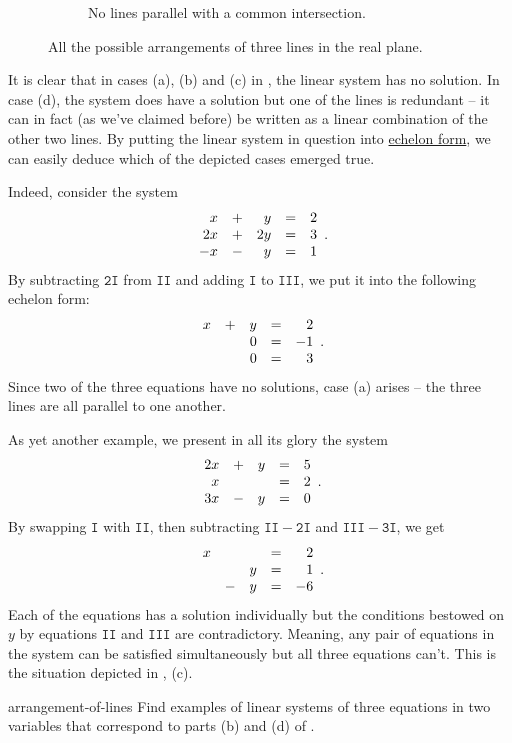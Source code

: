 \begin{figure}[ht]
\begin{subfigure}[t]{.45\textwidth}
  \caption{No lines parallel with a common intersection.}
 \end{subfigure}
 \caption{All the possible arrangements of three lines in the real plane.}
 \label{fig:arrangement-of-lines}
\end{figure}

It is clear that in cases (a), (b) and (c) in
, the linear system has no solution. In
case (d), the system does have a solution but one of the lines is redundant --
it can in fact (as we've claimed before) be written as a linear combination of
the other two lines. By putting the linear system in question into
\hyperref[def:echelon-form]{echelon form}, we can easily deduce which of the
depicted cases emerged true.

Indeed, consider the system
\[
 \begin{array}{r c r c r}
  x & + & y & = & 2\\
  2x & + & 2y & = & 3\\
  -x & - & y & = & 1
 \end{array}.
\]
By subtracting $\mathtt{2I}$ from $\mathtt{II}$ and adding $\mathtt{I}$ to
$\mathtt{III}$, we put it into the following echelon form:
\[
 \begin{array}{r c r c r}
  x & + & y & = & 2\\
    & & 0 & = & -1\\
    & & 0 & = & 3
 \end{array}.
\]
Since two of the three equations have no solutions, case (a) arises -- the three
lines are all parallel to one another.

As yet another example, we present in all its glory the system
\[
 \begin{array}{r c r c r}
  2x & + & y & = & 5\\
  x & & & = & 2\\
  3x & - & y & = & 0
 \end{array}.
\]
By swapping $\mathtt{I}$ with $\mathtt{II}$, then subtracting $\mathtt{II} -
\mathtt{2I}$ and $\mathtt{III} - \mathtt{3I}$, we get
\[
 \begin{array}{r c r c r}
  x & & & = & 2\\
  & & y & = & 1\\
  & - & y & = & -6
 \end{array}.
\]
Each of the equations has a solution individually but the conditions bestowed on
$y$ by equations $\mathtt{II}$ and $\mathtt{III}$ are contradictory. Meaning,
any pair of equations in the system can be satisfied simultaneously but all
three equations can't. This is the situation depicted in
, (c).

\begin{exercise}{}{arrangement-of-lines}
 Find examples of linear systems of three equations in two variables that
 correspond to parts (b) and (d) of .
\end{exercise}
